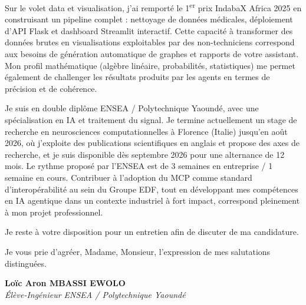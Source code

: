 \documentclass[a4paper,11pt]{article}
\begin{document}
Sur le volet data et visualisation, j'ai remporté le 1\textsuperscript{er} prix IndabaX Africa 2025 en construisant un pipeline complet : nettoyage de données médicales, déploiement d'API Flask et dashboard Streamlit interactif. Cette capacité à transformer des données brutes en visualisations exploitables par des non-techniciens correspond aux besoins de génération automatique de graphes et rapports de votre assistant. Mon profil mathématique (algèbre linéaire, probabilités, statistiques) me permet également de challenger les résultats produits par les agents en termes de précision et de cohérence.

Je suis en double diplôme ENSEA / Polytechnique Yaoundé, avec une spécialisation en IA et traitement du signal. Je termine actuellement un stage de recherche en neurosciences computationnelles à Florence (Italie) jusqu'en août 2026, où j'exploite des publications scientifiques en anglais et propose des axes de recherche, et je suis disponible dès septembre 2026 pour une alternance de 12 mois. Le rythme proposé par l'ENSEA est de 3 semaines en entreprise / 1 semaine en cours. Contribuer à l'adoption du MCP comme standard d'interopérabilité au sein du Groupe EDF, tout en développant mes compétences en IA agentique dans un contexte industriel à fort impact, correspond pleinement à mon projet professionnel.

Je reste à votre disposition pour un entretien afin de discuter de ma candidature.

Je vous prie d'agréer, Madame, Monsieur, l'expression de mes salutations distinguées.

\vspace{0.8cm}

\textbf{Loïc Aron MBASSI EWOLO}\\
\textit{Élève-Ingénieur ENSEA / Polytechnique Yaoundé}
\end{document}
